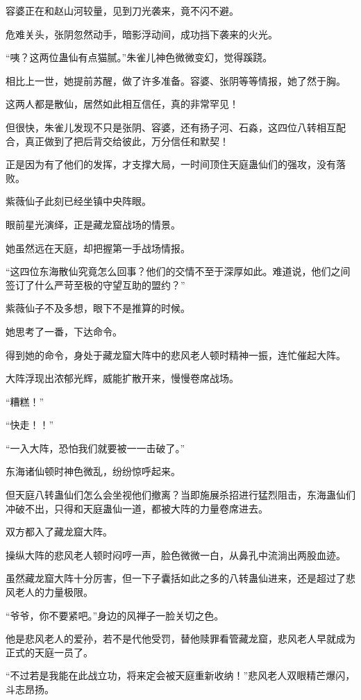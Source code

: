 \begin{this_body}
容婆正在和赵山河较量，见到刀光袭来，竟不闪不避。

危难关头，张阴忽然动手，暗影浮动间，成功挡下袭来的火光。

“咦？这两位蛊仙有点猫腻。”朱雀儿神色微微变幻，觉得蹊跷。

相比上一世，她提前苏醒，做了许多准备。容婆、张阴等等情报，她了然于胸。

这两人都是散仙，居然如此相互信任，真的非常罕见！

但很快，朱雀儿发现不只是张阴、容婆，还有扬子河、石淼，这四位八转相互配合，真正做到了把后背交给彼此，万分信任和默契！

正是因为有了他们的发挥，才支撑大局，一时间顶住天庭蛊仙们的强攻，没有落败。

紫薇仙子此刻已经坐镇中央阵眼。

眼前星光演绎，正是藏龙窟战场的情景。

她虽然远在天庭，却把握第一手战场情报。

“这四位东海散仙究竟怎么回事？他们的交情不至于深厚如此。难道说，他们之间签订了什么严苛至极的守望互助的盟约？”

紫薇仙子不及多想，眼下不是推算的时候。

她思考了一番，下达命令。

得到她的命令，身处于藏龙窟大阵中的悲风老人顿时精神一振，连忙催起大阵。

大阵浮现出浓郁光辉，威能扩散开来，慢慢卷席战场。

“糟糕！”

“快走！！”

“一入大阵，恐怕我们就要被一一击破了。”

东海诸仙顿时神色微乱，纷纷惊呼起来。

但天庭八转蛊仙们怎么会坐视他们撤离？当即施展杀招进行猛烈阻击，东海蛊仙们冲破不出，只得和天庭蛊仙一道，都被大阵的力量卷席进去。

双方都入了藏龙窟大阵。

操纵大阵的悲风老人顿时闷哼一声，脸色微微一白，从鼻孔中流淌出两股血迹。

虽然藏龙窟大阵十分厉害，但一下子囊括如此之多的八转蛊仙进来，还是超过了悲风老人的力量极限。

“爷爷，你不要紧吧。”身边的风禅子一脸关切之色。

他是悲风老人的爱孙，若不是代他受罚，替他赎罪看管藏龙窟，悲风老人早就成为正式的天庭一员了。

“不过若是我能在此战立功，将来定会被天庭重新收纳！”悲风老人双眼精芒爆闪，斗志昂扬。


\end{this_body}
